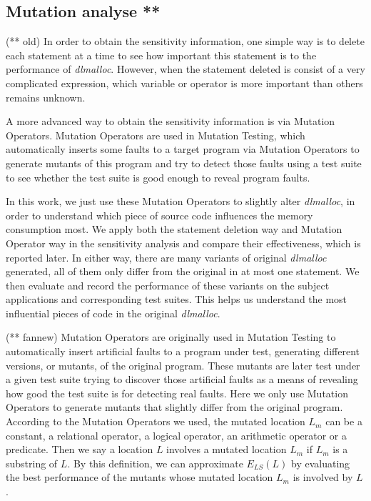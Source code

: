 \subsection{Mutation analyse **}
(** old)
In order to obtain the sensitivity information, one simple way is to delete each statement at a time to see how important this statement is to the performance of \emph{dlmalloc}. However, when the statement deleted is consist of a very complicated expression, which variable or operator is more important than others remains unknown. 

A more advanced way to obtain the sensitivity information is via Mutation Operators. Mutation Operators are used in Mutation Testing, which automatically inserts some faults to a target program via Mutation Operators to generate mutants of this program and try to detect those faults using a test suite to see whether the test suite is good enough to reveal program faults. 

In this work, we just use these Mutation Operators to slightly alter \emph{dlmalloc}, in order to understand which piece of source code influences the memory consumption most. We apply both the statement deletion way and Mutation Operator way in the sensitivity analysis and compare their effectiveness, which is reported later. In either way, there are many variants of original \emph{dlmalloc} generated, all of them only differ from the original in at most one statement. We then evaluate and record the performance of these variants on the subject applications and corresponding test suites. This helps us understand the most influential pieces of code in the original \emph{dlmalloc}.

(** fannew)
Mutation Operators are originally used in Mutation Testing to automatically insert artificial faults to a program under test, generating different versions, or mutants, of the original program. These mutants are later test under a given test suite trying to discover those artificial faults as a means of revealing how good the test suite is for detecting real faults. Here we only use Mutation Operators to generate mutants that slightly differ from the original program. According to the Mutation Operators we used, the mutated location $L_m$ can be a constant, a relational operator, a logical operator, an arithmetic operator or a predicate. Then we say a location $L$ involves a mutated location $L_m$ if $L_m$ is a substring of $L$. By this definition, we can approximate $E_{LS}(L)$ by evaluating the best performance of the mutants whose mutated location $L_m$ is involved by $L$. 

